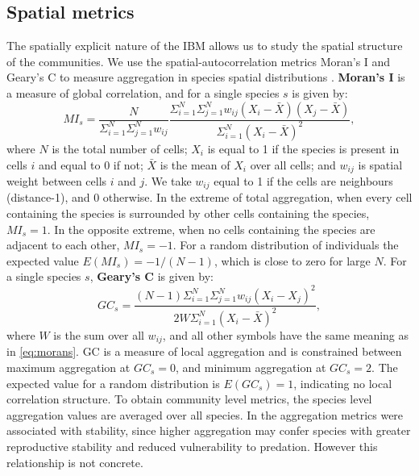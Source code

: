 \subsection{Spatial metrics}
\label{sec:def_spatial_metrics}
The spatially explicit nature of the IBM allows us to study the spatial structure of the communities. We use the spatial-autocorrelation metrics Moran's I and Geary's C to measure aggregation in species spatial distributions \cite{dale2014spatial, lurgi2015effects}. \textbf{Moran's I} is a measure of global correlation, and for a single species $s$ is given by:
\begin{equation}
MI_s = \frac{N}{\Sigma_{i=1}^N \Sigma_{j=1}^N w_{ij}}  \frac{\Sigma_{i=1}^N \Sigma_{j=1}^N w_{ij}(X_i - \bar{X})(X_j - \bar{X})}{\Sigma_{i=1}^N (X_i - \bar{X})^2},
\label{eq:morans}
\end{equation}
%
where $N$ is the total number of cells; $X_i$ is equal to 1 if the species is present in cells $i$ and equal to 0 if not; $\bar{X}$ is the mean of $X_i$ over all cells; and $w_{ij}$ is spatial weight between cells $i$ and $j$. We take $w_{ij}$ equal to 1 if the cells are neighbours (distance-1), and 0 otherwise. In the extreme of total aggregation, when every cell containing the species is surrounded by other cells containing the species, $MI_s=1$. In the opposite extreme, when no cells containing the species are adjacent to each other, $MI_s=-1$. For a random distribution of individuals the expected value $E(MI_s) = -1/(N-1)$, which is close to zero for large $N$. For a single species $s$, \textbf{Geary's C} is given by:
\begin{equation}
GC_s = \frac{(N-1)\Sigma_{i=1}^N \Sigma_{j=1}^N w_{ij}(X_i - X_j)^2}{2W \Sigma_{i=1}^N (X_i - \bar{X})^2},
\label{eq:gearys}
\end{equation}
%
where $W$ is the sum over all $w_{ij}$, and all other symbols have the same meaning as in \eqref{eq:morans}. GC is a measure of local aggregation and is constrained between maximum aggregation at $GC_s=0$, and minimum aggregation at $GC_s=2$. The expected value for a random distribution is $E(GC_s)=1$, indicating no local correlation structure. To obtain community level metrics, the species level aggregation values are averaged over all species. In \cite{lurgi2015effects} the aggregation metrics were associated with stability, since higher aggregation may confer species with greater reproductive stability and reduced vulnerability to predation. However this relationship is not concrete.

